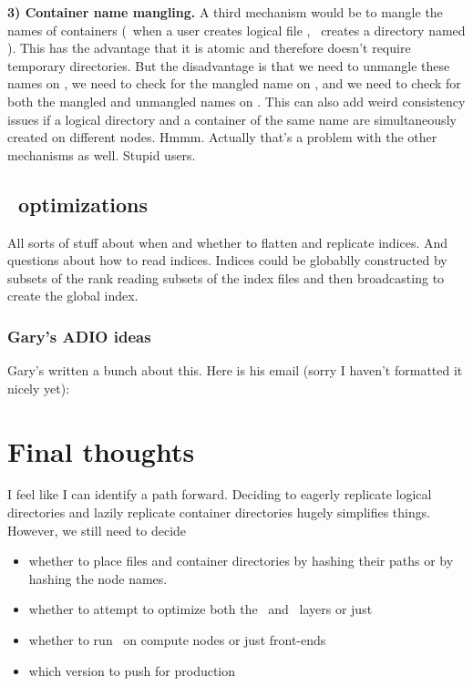 \documentclass[10pt]{article}
\begin{document}
{\bf 3) Container name mangling.}  A third mechanism would be to mangle the
names of containers (\eg\ when a user creates logical file , \plfs\
creates a directory named ).  This has the
advantage that it is atomic and therefore doesn't require temporary
directories.  But the disadvantage is that we need to unmangle these names on
\syscall{readdir}, we need to check for the mangled name on \syscall{mkdir},
and we need to check for both the mangled and unmangled names on
\syscall{stat}.  This can also add weird consistency issues if a logical
directory and a container of the same name are simultaneously created on
different nodes.  Hmmm.  Actually that's a problem with the other mechanisms as
well.  Stupid users.

\subsection{\adio\ optimizations}
\label{sec-adio-opt}

All sorts of stuff about when and whether to flatten and replicate indices.
And questions about how to read indices.  Indices could be globablly
constructed by subsets of the rank reading subsets of the index files and then
broadcasting to create the global index.  

\subsubsection{Gary's ADIO ideas}
Gary's written a bunch about this.
Here is his email (sorry I haven't formatted it nicely yet):




\section{Final thoughts}

I feel like I can identify a path forward.  Deciding to eagerly replicate
logical directories and lazily replicate container directories hugely
simplifies things.  However, we still need to decide 

\begin{itemize}
\item{whether to place files and 
container directories by hashing their paths or by hashing the node names.  
}
\item{whether to attempt to optimize both the \adio\ and \fuse\ layers or
just \adio}
\item{whether to run \fuse\ on compute nodes or just front-ends}
\item{which version to push for production}
\end{itemize}
\end{document}

